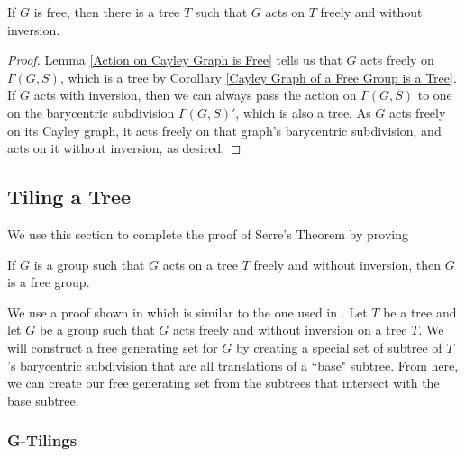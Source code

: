 \begin{thm}\label{Serre First Direction}
    If $G$ is free, then there is a tree $T$ such that $G$ acts on $T$ freely and without inversion. 
\end{thm}

\begin{proof}
    Lemma \ref{Action on Cayley Graph is Free} tells us that $G$ acts freely on $\Gamma(G,S)$, which is a tree by Corollary \ref{Cayley Graph of a Free Group is a Tree}. If $G$ acts with inversion, then we can always pass the action on $\Gamma(G,S)$ to one on the barycentric subdivision $\Gamma(G,S)'$, which is also a tree. As $G$ acts freely on its Cayley graph, it acts freely on that graph's barycentric subdivision, and acts on it without inversion, as desired. 
\end{proof}

\subsection{Tiling a Tree}

We use this section to complete the proof of Serre's Theorem by proving

\begin{thm}\label{Serre Second Direction}
    If $G$ is a group such that $G$ acts on a tree $T$ freely and without inversion, then $G$ is a free group. 
\end{thm}

We use a proof shown in \cite{ClayMargalit2017} which is similar to the one used in \cite{Serre1980}. Let $T$ be a tree and let $G$ be a group such that $G$ acts freely and without inversion on a tree $T$. We will construct a free generating set for $G$ by creating a special set of subtree of $T$'s barycentric subdivision that are all translations of a ``base" subtree. From here, we can create our free generating set from the subtrees that intersect with the base subtree. 

\subsubsection{G-Tilings}


